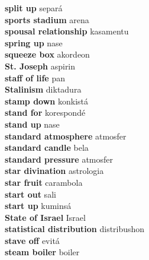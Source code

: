 \textbf{ split up  } separá \\
\textbf{ sports stadium  } arena \\
\textbf{ spousal relationship  } kasamentu \\
\textbf{ spring up  } nase \\
\textbf{ squeeze box  } akordeon \\
\textbf{ St. Joseph  } aspirin \\
\textbf{ staff of life  } pan \\
\textbf{ Stalinism  } diktadura \\
\textbf{ stamp down  } konkistá \\
\textbf{ stand for  } korespondé \\
\textbf{ stand up  } nase \\
\textbf{ standard atmosphere  } atmosfer \\
\textbf{ standard candle  } bela \\
\textbf{ standard pressure  } atmosfer \\
\textbf{ star divination  } astrologia \\
\textbf{ star fruit  } carambola \\
\textbf{ start out  } sali \\
\textbf{ start up  } kuminsá \\
\textbf{ State of Israel  } Israel \\
\textbf{ statistical distribution  } distribushon \\
\textbf{ stave off  } evitá \\
\textbf{ steam boiler  } boiler \\
